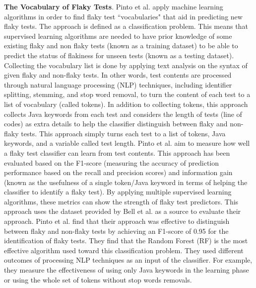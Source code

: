 \textbf{The Vocabulary of Flaky Tests}. Pinto et al. \cite{Pinto2020WhatIT} apply machine learning algorithms in order to find flaky test ``vocabularies" that aid in predicting new flaky tests. The approach is defined as a classification problem. This means that supervised learning algorithms are needed to have prior knowledge of some existing flaky and non flaky tests (known as a training dataset) to be able to predict the status of flakiness for unseen tests (known as a testing dataset). Collecting the vocabulary list is done by applying text analysis on the syntax of given flaky and non-flaky tests. In other words, test contents are processed through natural language processing (NLP) techniques, including identifier splitting, stemming, and stop word removal, to turn the content of each test to a list of vocabulary (called tokens). In addition to collecting tokens, this approach collects Java keywords from each test and considers the length of tests (line of codes) as extra details to help the classifier distinguish between flaky and non-flaky tests. This approach simply turns each test to a list of tokens, Java keywords, and a variable called test length. Pinto et al. \cite{Pinto2020WhatIT} aim to measure how well a flaky test classifier can learn from test contents. This approach has been evaluated based on the F1-score (measuring the accuracy of prediction performance based on the recall and precision scores) and information gain (known as the usefulness of a single token/Java keyword in terms of helping the classifier to identify a flaky test). By applying multiple supervised learning algorithms, these metrics can show the strength of flaky test predictors. This approach uses the dataset provided by Bell et al. \cite{bell2018deflaker} as a source to evaluate their approach. Pinto et al. \cite{Pinto2020WhatIT} find that their approach was effective to distinguish between flaky and non-flaky tests by achieving an F1-score of 0.95 for the identification of flaky tests. They find that the Random Forest (RF) is the most effective algorithm used toward this classification problem. They used different outcomes of processing NLP techniques as an input of the classifier. For example, they measure the effectiveness of using only Java keywords in the learning phase or using the whole set of tokens without stop words removals.


